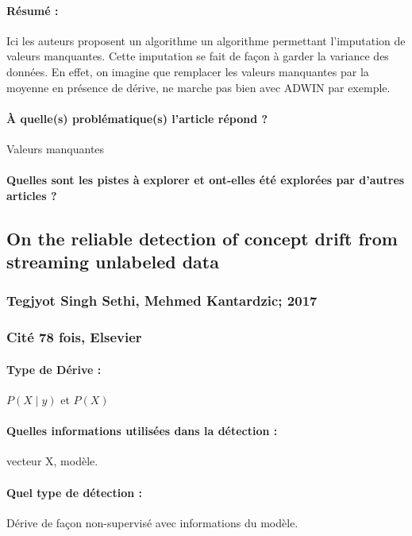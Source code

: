 \documentclass[11pt,a4paper]{report}
\begin{document}
\paragraph{Résumé :} Ici les auteurs proposent un algorithme un algorithme permettant l'imputation de valeurs manquantes. Cette imputation se fait de façon à garder la variance des données. En effet, on imagine que remplacer les valeurs manquantes par la moyenne en présence de dérive, ne marche pas bien avec ADWIN par exemple.

\paragraph{À quelle(s) problématique(s) l'article répond ?} Valeurs manquantes

\paragraph{Quelles sont les pistes à explorer et ont-elles  été explorées par d'autres articles ?}









\subsection{On the reliable detection of concept drift from streaming unlabeled data}
\subsubsection{Tegjyot Singh Sethi, Mehmed Kantardzic; 2017}
\subsubsection{Cité 78 fois, Elsevier}


\paragraph{Type de Dérive :} $P(X\mid y)$ et $P(X)$
\paragraph{Quelles informations utilisées dans la détection :} vecteur X, modèle.
\paragraph{Quel type de détection :} Dérive de façon non-supervisé avec informations du modèle.
\end{document}
